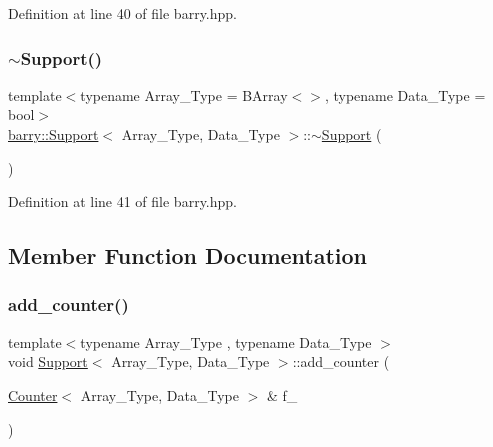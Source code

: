 Definition at line 40 of file barry.\+hpp.

\mbox{\label{classbarry_1_1_support_a1ffd5ee63fa68338cbbf443e1e54e5b4}} 
\subsubsection{\texorpdfstring{$\sim$\+Support()}{~Support()}}
{\footnotesize\ttfamily template$<$typename Array\+\_\+\+Type  = B\+Array$<$$>$, typename Data\+\_\+\+Type  = bool$>$ \\
\hyperlink{classbarry_1_1_support}{barry\+::\+Support}$<$ Array\+\_\+\+Type, Data\+\_\+\+Type $>$\+::$\sim$\hyperlink{classbarry_1_1_support}{Support} (\begin{DoxyParamCaption}{ }\end{DoxyParamCaption})\hspace{0.3cm}{\ttfamily [inline]}}



Definition at line 41 of file barry.\+hpp.



\subsection{Member Function Documentation}
\mbox{\label{classbarry_1_1_support_a9fc89bd8b15dcad6a4140a3c74073d10}} 
\subsubsection{\texorpdfstring{add\+\_\+counter()}{add\_counter()}}
{\footnotesize\ttfamily template$<$typename Array\+\_\+\+Type , typename Data\+\_\+\+Type $>$ \\
void \hyperlink{classbarry_1_1_support}{Support}$<$ Array\+\_\+\+Type, Data\+\_\+\+Type $>$\+::add\+\_\+counter (\begin{DoxyParamCaption}\item[{\hyperlink{classbarry_1_1_counter}{Counter}$<$ Array\+\_\+\+Type, Data\+\_\+\+Type $>$ \&}]{f\+\_\+ }\end{DoxyParamCaption})\hspace{0.3cm}{\ttfamily [inline]}}



